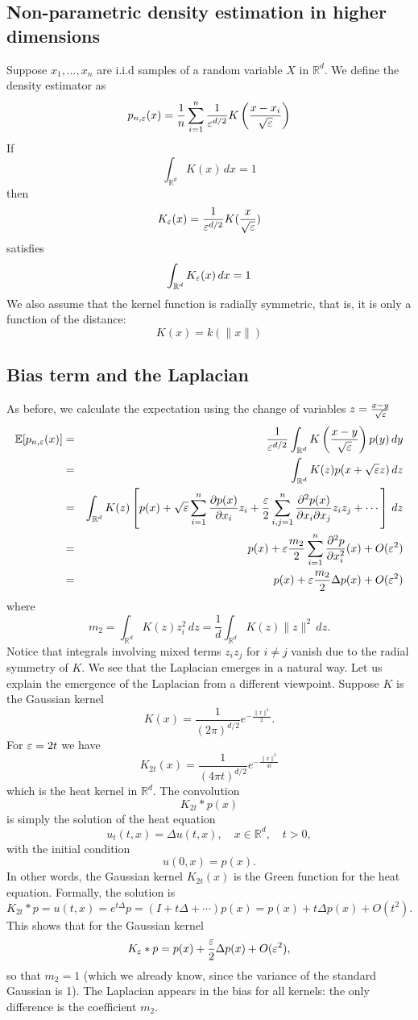 \subsection{Non-parametric density estimation in higher dimensions}
Suppose $x_1,\ldots,x_n$ are i.i.d samples of a random variable $X$ in $\mathbb{R}^d$.
We define the density estimator as
$$p_{n,\varepsilon}(x) = \frac{1}{n} \sum_{i=1}^n \frac{1}{\varepsilon^{d/2}}K\left(\frac{x-x_i}{\sqrt{\varepsilon}}\right)$$
If
$$\int_{\mathbb{R}^d} K(x)\,dx = 1$$
then
$$K_{\varepsilon}(x) = \frac{1}{\varepsilon^{d/2}}K(\frac{x}{\sqrt{\varepsilon}})$$
satisfies
$$\int_{\mathbb{R}^d} K_{\varepsilon}(x)\,dx = 1$$
We also assume that the kernel function is radially symmetric, that is, it is only a function of the distance:
$$K(x) = k(\|x\|)$$

\subsection{Bias term and the Laplacian}
As before, we calculate the expectation using the change of variables $z = \frac{x-y}{\sqrt{\varepsilon}}$
\begin{eqnarray*}
\mathbb{E}[p_{n,\varepsilon}(x)] &=& \frac{1}{\varepsilon^{d/2}}\int_{\mathbb{R}^d} K\left(\frac{x-y}{\sqrt{\varepsilon}}\right)p(y)\,dy \\
&=& \int_{\mathbb{R}^d} K(z)p(x+\sqrt{\varepsilon}z)\,dz \\
&=& \int_{\mathbb{R}^d} K(z)\left[p(x) + \sqrt{\varepsilon}\sum_{i=1}^n \frac{\partial p(x)}{\partial x_i} z_i + \frac{\varepsilon}{2}\sum_{i,j=1}^n \frac{\partial^2 p(x)}{\partial x_i \partial x_j} z_i z_j + \cdots \right]\,dz \\
&=& p(x) + \varepsilon  \frac{m_2}{2} \sum_{i=1}^n \frac{\partial^2 p}{\partial x_i^2}(x) + O(\varepsilon^2) \\
&=& p(x) + \varepsilon  \frac{m_2}{2} \Delta p(x) + O(\varepsilon^2)
\end{eqnarray*}
where
$$m_2 = \int_{\mathbb{R}^d} K(z)z_i^2\,dz = \frac{1}{d} \int_{\mathbb{R}^d} K(z)\|z\|^2\,dz.$$
Notice that integrals involving mixed terms $z_iz_j$ for $i\neq j$ vanish due to the radial symmetry of $K$. We see that the Laplacian emerges in a natural way. Let us explain the emergence of the Laplacian from a different viewpoint. Suppose $K$ is the Gaussian kernel
$$K(x) = \frac{1}{(2\pi)^{d/2}}e^{-\frac{\|x\|^2}{2}}.$$
For $\varepsilon = 2t$ we have
$$K_{2t}(x) = \frac{1}{(4\pi t)^{d/2}}e^{-\frac{\|x\|^2}{4t}}$$
which is the heat kernel in $\mathbb{R}^d$. The convolution
$$K_{2t}\ast p(x)$$
is simply the solution of the heat equation
$$u_t(t,x) = \Delta u(t,x),\quad x\in \mathbb{R}^d, \quad t > 0,$$
with the initial condition $$u(0,x) = p(x).$$
In other words, the Gaussian kernel $K_{2t}(x)$ is the Green function for the heat equation. 
Formally, the solution is
$$K_{2t}\ast p = u(t,x) = e^{t\Delta}p = (I + t\Delta + \cdots)p(x) = p(x) + t\Delta p(x) + O(t^2).$$
This shows that for the Gaussian kernel
$$K_{\varepsilon}\ast p = p(x) + \frac{\varepsilon}{2}\Delta p(x) + O(\varepsilon^2),$$
so that $m_2 = 1$ (which we already know, since the variance of the standard Gaussian is 1). The Laplacian appears in the bias for all kernels: the only difference is the coefficient $m_2$.
